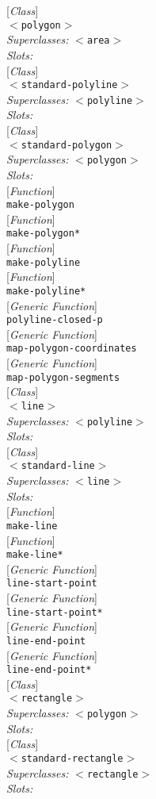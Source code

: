 \documentclass[10pt]{book}
\newenvironment{defother}[2]{[\textit{#1}]\\\texttt{#2}}{\\}
\newenvironment{defun}[1]{\begin{defother}{Function}{#1}}{\end{defother}}
\newenvironment{defgeneric}[1]{\begin{defother}{Generic Function}{#1}}{\end{defother}}
\newenvironment{defclass}[2]{[\textit{Class}]\\\texttt{#1}\\\textit{Superclasses:} \texttt{#2}\\\textit{Slots:}}{\\}
\begin{document}
\begin{defclass}{$<$polygon$>$}{$<$area$>$}\end{defclass}
\begin{defclass}{$<$standard-polyline$>$}{$<$polyline$>$}\end{defclass}
\begin{defclass}{$<$standard-polygon$>$}{$<$polygon$>$}\end{defclass}
\begin{defun}{make-polygon}\end{defun}
\begin{defun}{make-polygon*}\end{defun}
\begin{defun}{make-polyline}\end{defun}
\begin{defun}{make-polyline*}\end{defun}
\begin{defgeneric}{polyline-closed-p}\end{defgeneric}
\begin{defgeneric}{map-polygon-coordinates}\end{defgeneric}
\begin{defgeneric}{map-polygon-segments}\end{defgeneric}
\begin{defclass}{$<$line$>$}{$<$polyline$>$}\end{defclass}
\begin{defclass}{$<$standard-line$>$}{$<$line$>$}\end{defclass}
\begin{defun}{make-line}\end{defun}
\begin{defun}{make-line*}\end{defun}
\begin{defgeneric}{line-start-point}\end{defgeneric}
\begin{defgeneric}{line-start-point*}\end{defgeneric}
\begin{defgeneric}{line-end-point}\end{defgeneric}
\begin{defgeneric}{line-end-point*}\end{defgeneric}
\begin{defclass}{$<$rectangle$>$}{$<$polygon$>$}\end{defclass}
\begin{defclass}{$<$standard-rectangle$>$}{$<$rectangle$>$}\end{defclass}
\end{document}
